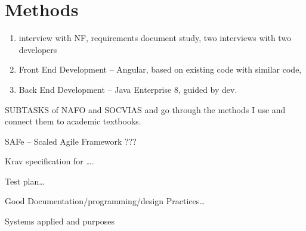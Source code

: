 \documentclass[../main.tex]{subfiles}
\begin{document}
\section{Methods}

\begin{enumerate}
\item interview with NF, requirements document study, two interviews with two developers 
\item Front End Development – Angular, based on existing code with similar code,  
\item Back End Development – Java Enterprise 8, guided by dev. 
\end{enumerate}

SUBTASKS of NAFO and SOCVIAS and go through the methods I use and connect them to academic textbooks.  

SAFe – Scaled Agile Framework ??? 

Krav specification for …. 

Test plan… 

Good Documentation/programming/design Practices… 

Systems applied and purposes 
\end{document}
